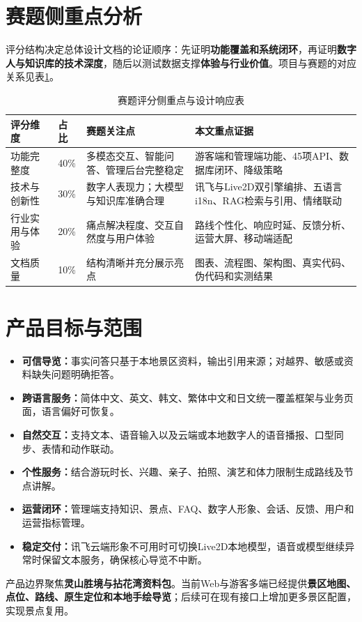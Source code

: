 \section{赛题侧重点分析}

评分结构决定总体设计文档的论证顺序：先证明\textbf{功能覆盖和系统闭环}，再证明\textbf{数字人与知识库的技术深度}，随后以测试数据支撑\textbf{体验与行业价值}。项目与赛题的对应关系见表\ref{tab:topic-mapping}。

\begin{table}[H]
  \centering
  \caption{赛题评分侧重点与设计响应表}\label{tab:topic-mapping}
  \begin{tabularx}{\textwidth}{p{}p{}X X}
    \toprule
    评分维度 & 占比 & 赛题关注点 & 本文重点证据 \\
    \midrule
    功能完整度 & 40\% & 多模态交互、智能问答、管理后台完整稳定 & 游客端和管理端功能、45项API、数据库闭环、降级策略 \\
    技术与创新性 & 30\% & 数字人表现力；大模型与知识库准确合理 & 讯飞与Live2D双引擎编排、五语言i18n、RAG检索与引用、情绪联动 \\
    行业实用与体验 & 20\% & 痛点解决程度、交互自然度与用户体验 & 路线个性化、响应时延、反馈分析、运营大屏、移动端适配 \\
    文档质量 & 10\% & 结构清晰并充分展示亮点 & 图表、流程图、架构图、真实代码、伪代码和实测结果 \\
    \bottomrule
  \end{tabularx}
\end{table}

\section{产品目标与范围}

\begin{itemize}
  \item \textbf{可信导览：}事实问答只基于本地景区资料，输出引用来源；对越界、敏感或资料缺失问题明确拒答。
  \item \textbf{跨语言服务：}简体中文、英文、韩文、繁体中文和日文统一覆盖框架与业务页面，语言偏好可恢复。
  \item \textbf{自然交互：}支持文本、语音输入以及云端或本地数字人的语音播报、口型同步、表情和动作联动。
  \item \textbf{个性服务：}结合游玩时长、兴趣、亲子、拍照、演艺和体力限制生成路线及节点讲解。
  \item \textbf{运营闭环：}管理端支持知识、景点、FAQ、数字人形象、会话、反馈、用户和运营指标管理。
  \item \textbf{稳定交付：}讯飞云端形象不可用时可切换Live2D本地模型，语音或模型继续异常时保留文本服务，确保核心导览不中断。
\end{itemize}

产品边界聚焦\textbf{灵山胜境与拈花湾资料包}。当前Web与游客多端已经提供\textbf{景区地图、点位、路线、原生定位和本地手绘导览}；后续可在现有接口上增加更多景区配置，实现景点复用。
